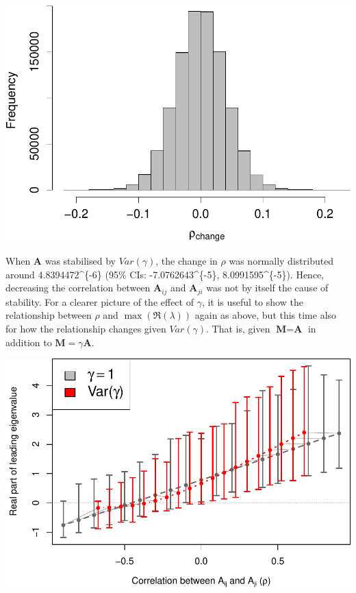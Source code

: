 \documentclass[]{article}
\begin{document}
\includegraphics{revision_notes_files/figure-latex/unnamed-chunk-7-1.pdf}

When \(\textbf{A}\) was stabilised by \(Var(\gamma)\), the change in
\(\rho\) was normally distributed around 4.8394472\^{}\{-6\}
(95\% CIs: -7.0762643\^{}\{-5\}, 8.0991595\^{}\{-5\}).
Hence, decreasing the correlation between \(\textbf{A}_{ij}\) and
\(\textbf{A}_{ji}\) was not by itself the cause of stability. For a
clearer picture of the effect of \(\gamma\), it is useful to show the
relationship between \(\rho\) and \(\max(\Re(\lambda))\) again as above,
but this time also for how the relationship changes given
\(Var(\gamma)\). That is, given \(\textbf{M} = \textbf{A}\) in addition
to \(\textbf{M} = \gamma\textbf{A}\).

\includegraphics{revision_notes_files/figure-latex/unnamed-chunk-8-1.pdf}
\end{document}
